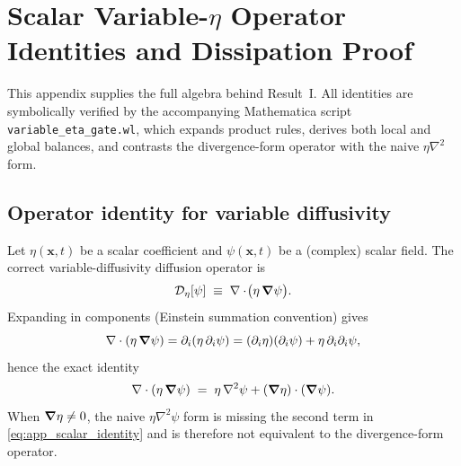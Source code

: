 \documentclass[11pt]{article}
\theoremstyle{plain}
\theoremstyle{definition}
\theoremstyle{remark}
\newcommand{\diver}{\nabla\cdot}
\begin{document}
\section{Scalar Variable-$\eta$ Operator Identities and Dissipation Proof}\label{sec:app_scalar_eta}

This appendix supplies the full algebra behind Result~I. All identities are symbolically verified by
the accompanying Mathematica script \texttt{variable\_eta\_gate.wl}, which expands product rules,
derives both local and global balances, and contrasts the divergence-form operator with the naive
$\eta\nabla^2$ form.

\subsection{Operator identity for variable diffusivity}
Let $\eta(\mathbf{x},t)$ be a scalar coefficient and $\psi(\mathbf{x},t)$ be a (complex) scalar field.
The correct variable-diffusivity diffusion operator is
\begin{equation}\label{eq:app_scalar_div_form}
  \mathcal{D}_{\eta}[\psi] \;\equiv\; \diver\!\big(\eta\,\grad\psi\big).
\end{equation}
Expanding in components (Einstein summation convention) gives
\[
\diver(\eta\,\grad\psi)
= \partial_i(\eta\,\partial_i\psi)
= (\partial_i\eta)(\partial_i\psi) + \eta\,\partial_i\partial_i\psi,
\]
hence the exact identity
\begin{equation}\label{eq:app_scalar_identity}
  \diver(\eta\,\grad\psi)
  \;=\;
  \eta\,\nabla^2\psi + (\grad\eta)\cdot(\grad\psi).
\end{equation}
When $\grad\eta\neq 0$, the naive $\eta\nabla^2\psi$ form is missing the second term in
\eqref{eq:app_scalar_identity} and is therefore not equivalent to the divergence-form operator.
\end{document}
